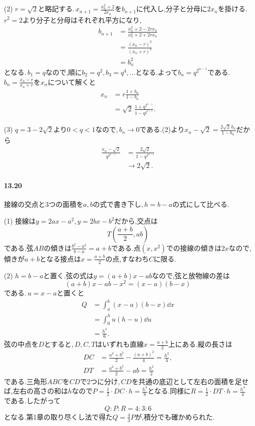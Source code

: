 (2) $r=\sqrt2$と略記する.\,$x_{n+1}=\frac{x_n^2+2}{2x_n}$を$b_{n+1}$に代入し,分子と分母に$2x_n$を掛ける.\,$r^2=2$より分子と分母はそれぞれ平方になり,
\[
 \begin{aligned}
 b_{n+1}
 &=\frac{x_n^2+2-2rx_n}{x_n^2+2+2rx_n}\\
 &=\frac{(x_n-r)^2}{(x_n+r)^2}\\
 &=b_n^2
 \end{aligned}
\]
となる.\,$b_1=q$なので,順に$b_2=q^2,b_3=q^4,\ldots$となる.よって$b_n=q^{2^{n-1}}$である.\,$b_n=\frac{x_n-r}{x_n+r}$を$x_n$について解くと
\[
 \begin{aligned}
 x_n&=r\frac{1+b_n}{1-b_n}\\
 &=\boxed{\sqrt2\,\frac{1+q^{2^{n-1}}}{1-q^{2^{n-1}}}}.
 \end{aligned}
\]

(3) $q=3-2\sqrt2$より$0<q<1$なので,\,$b_n\to0$である.(2)より$x_n-\sqrt2=\frac{2\sqrt2\,b_n}{1-b_n}$だから
\[
 \begin{aligned}
 \frac{x_n-\sqrt2}{q^{2^{n-1}}}
 &=\frac{2\sqrt2}{1-q^{2^{n-1}}}\\
 &\longrightarrow\boxed{2\sqrt2}.
 \end{aligned}
\]

\paragraph{13.20}
接線の交点と3つの面積を$a,b$の式で書き下し,\,$h=b-a$の式にして比べる.

(1) 接線は$y=2ax-a^2$,\,$y=2bx-b^2$だから,交点は
\[
 \boxed{T\left(\frac{a+b}{2},ab\right)}
\]
である.弦$AB$の傾きは$\frac{b^2-a^2}{b-a}=a+b$である.点$(x,x^2)$での接線の傾きは$2x$なので,傾きが$a+b$となる接点は$x=\frac{a+b}{2}$の点,すなわち$C$に限る.

(2) $h=b-a$と置く.弦の式は$y=(a+b)x-ab$なので,弦と放物線の差は
\[
 (a+b)x-ab-x^2=(x-a)(b-x)
\]
である.\,$u=x-a$と置くと
\[
 \begin{aligned}
 Q&=\int_a^b(x-a)(b-x)\dd x\\
 &=\int_0^h u(h-u)\dd u\\
 &=\frac{h^3}{6}.
 \end{aligned}
\]
弦の中点を$D$とすると,\,$D,C,T$はいずれも直線$x=\frac{a+b}{2}$上にある.縦の長さは
\[
 \begin{aligned}
 DC&=\frac{a^2+b^2}{2}-\frac{(a+b)^2}{4}=\frac{h^2}{4},\\
 DT&=\frac{a^2+b^2}{2}-ab=\frac{h^2}{2}
 \end{aligned}
\]
である.三角形$ABC$を$CD$で2つに分け,\,$CD$を共通の底辺として左右の面積を足せば,左右の高さの和は$h$なので$P=\frac12\cdot DC\cdot h=\frac{h^3}{8}$となる.同様に$R=\frac12\cdot DT\cdot h=\frac{h^3}{4}$である.したがって
\[
 \boxed{Q:P:R=4:3:6}
\]
となる.第1章の取り尽くし法で得た$Q=\frac43P$が,積分でも確かめられた.

